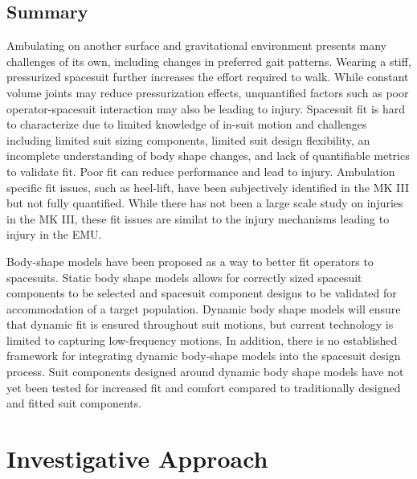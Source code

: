 \documentclass[defaultstyle,11pt]{comps}
\providecommand{\DIFaddbegin}{} %
\providecommand{\DIFaddend}{} %
\providecommand{\DIFdelbegin}{} %
\providecommand{\DIFdelend}{} %
\newcommand{\DIFscaledelfig}{0.5}
\newlength{\DIFdelgraphicswidth} %
\newlength{\DIFdelgraphicsheight} %
\newcommand{\DIFaddincludegraphics}[2][]{{\color{blue}\fbox{\DIFOincludegraphics[#1]{#2}}}} %
\newcommand{\DIFdelincludegraphics}[2][]{%
\sbox{\DIFdelgraphicsbox}{\DIFOincludegraphics[#1]{#2}}%
\settoboxwidth{\DIFdelgraphicswidth}{\DIFdelgraphicsbox} %
\settoboxtotalheight{\DIFdelgraphicsheight}{\DIFdelgraphicsbox} %
\scalebox{\DIFscaledelfig}{%
\parbox[b]{\DIFdelgraphicswidth}{\usebox{\DIFdelgraphicsbox}\\[-\baselineskip] \rule{\DIFdelgraphicswidth}{0em}}\llap{\resizebox{\DIFdelgraphicswidth}{\DIFdelgraphicsheight}{%
\setlength{\unitlength}{\DIFdelgraphicswidth}%
\begin{picture}(1,1)%
\thicklines\linethickness{2pt} %
{\color[rgb]{1,0,0}\put(0,0){\framebox(1,1){}}}%
{\color[rgb]{1,0,0}\put(0,0){\line( 1,1){1}}}%
{\color[rgb]{1,0,0}\put(0,1){\line(1,-1){1}}}%
\end{picture}%
}\hspace*{3pt}}} %
} %
\DeclareRobustCommand{\DIFaddbegin}{\DIFOaddbegin \let\includegraphics\DIFaddincludegraphics} %
\DeclareRobustCommand{\DIFaddend}{\DIFOaddend \let\includegraphics\DIFOincludegraphics} %
\DeclareRobustCommand{\DIFdelbegin}{\DIFOdelbegin \let\includegraphics\DIFdelincludegraphics} %
\DeclareRobustCommand{\DIFdelend}{\DIFOaddend \let\includegraphics\DIFOincludegraphics} %
\begin{document}
\hypertarget{summary-1}{%
\section{Summary}\label{summary-1}}

Ambulating on another surface and gravitational environment presents many challenges of its own, including changes in preferred gait patterns.
Wearing a stiff, pressurized spacesuit further increases the effort required to walk.
While constant volume joints may reduce pressurization effects, unquantified factors such as poor operator-spacesuit interaction may also be leading to injury.
Spacesuit fit is hard to characterize due to limited knowledge of in-suit motion and challenges including limited suit sizing components, limited suit design flexibility, an incomplete understanding of body shape changes, and lack of quantifiable metrics to validate fit.
Poor fit can reduce performance and lead to injury.
Ambulation specific fit issues, such as heel-lift, have been subjectively identified in the MK III but not fully quantified.
While there has not been a large scale study on injuries in the MK III, these fit issues are similat to the injury mechanisms leading to injury in the EMU.

Body-shape models have been proposed as a way to better fit operators to spacesuits.
Static body shape models allows for correctly sized spacesuit components to be selected and spacesuit component designs to be validated for accommodation of a target population.
Dynamic body shape models will ensure that dynamic fit is ensured throughout suit motions, but current technology is limited to capturing low-frequency motions.
In addition, there is no established framework for integrating dynamic body-shape models into the spacesuit design process.
Suit components designed around dynamic body shape models have not yet been tested for increased fit and comfort compared to traditionally designed and fitted suit components.

\DIFdelbegin %
\DIFdelend \DIFaddbegin \hypertarget{investigative-approach}{%
\chapter{Investigative Approach}\label{investigative-approach}}
\DIFaddend 
\end{document}
